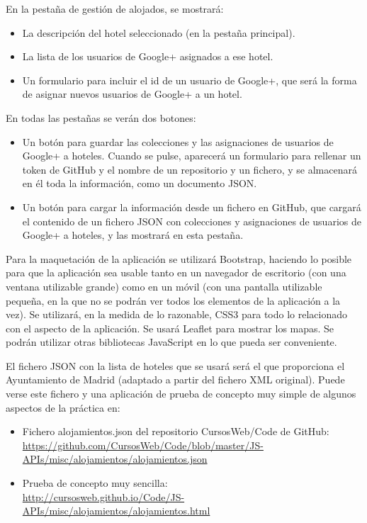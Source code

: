 En la pestaña de gestión de alojados, se mostrará:

\begin{itemize}
  \item La descripción del hotel seleccionado (en la pestaña principal).
  \item La lista de los usuarios de Google+ asignados a ese hotel.
  \item Un formulario para incluir el id de un usuario de Google+, que será la forma de asignar nuevos usuarios de Google+ a un hotel.
\end{itemize}

En todas las pestañas se verán dos botones:

\begin{itemize}
  \item Un botón para guardar las colecciones y las asignaciones de usuarios de Google+ a hoteles. Cuando se pulse, aparecerá un formulario para rellenar un token de GitHub y el nombre de un repositorio y un fichero, y se almacenará en él toda la información, como un documento JSON.
  \item Un botón para cargar la información desde un fichero en GitHub, que cargará el contenido de un fichero JSON con colecciones y asignaciones de usuarios de Google+ a hoteles, y las mostrará en esta pestaña.
\end{itemize}

Para la maquetación de la aplicación se utilizará Bootstrap, haciendo lo posible para que la aplicación sea usable tanto en un navegador de escritorio (con una ventana utilizable grande) como en un móvil (con una pantalla utilizable pequeña, en la que no se podrán ver todos los elementos de la aplicación a la vez). Se utilizará, en la medida de lo razonable, CSS3 para todo lo relacionado con el aspecto de la aplicación. Se usará Leaflet para mostrar los mapas. Se podrán utilizar otras bibliotecas JavaScript en lo que pueda ser conveniente.

El fichero JSON con la lista de hoteles que se usará será el que proporciona el Ayuntamiento de Madrid (adaptado a partir del fichero XML original). Puede verse este fichero y una aplicación de prueba de concepto muy simple de algunos aspectos de la práctica en:

\begin{itemize}
  \item Fichero alojamientos.json del repositorio CursosWeb/Code de GitHub: \\
  \url{https://github.com/CursosWeb/Code/blob/master/JS-APIs/misc/alojamientos/alojamientos.json}
  \item Prueba de concepto muy sencilla: \\
  \url{http://cursosweb.github.io/Code/JS-APIs/misc/alojamientos/alojamientos.html}
\end{itemize}

